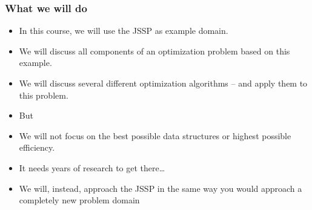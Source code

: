 \documentclass[mathserif]{beamer}%
\begin{document}
%
\begin{frame}%
\frametitle{What we will do}%
\begin{itemize}%
\item In this course, we will use the JSSP as example domain.%
\item<2-> We will discuss all components of an optimization problem based on this example.%
\item<3-> We will discuss several different optimization algorithms -- and apply them to this problem.%
\item<4-> \alert{But}%
\item<5-> We will \alert{not} focus on the best possible data structures or highest possible efficiency.%
\item<6-> It needs years of research to get there\dots%
\item<7-> We will, instead, approach the JSSP in the same way you would approach a completely new problem domain%
\end{itemize}%
\end{frame}%
%
\end{document}
